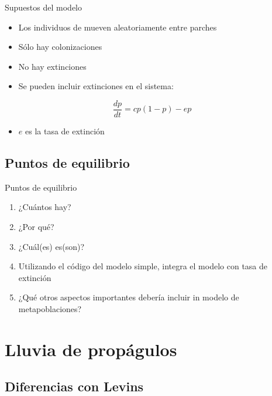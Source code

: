 \documentclass[
  11pt,
  ignorenonframetext,
]{beamer}
\providecommand{\tightlist}{%
  \setlength{\itemsep}{0pt}\setlength{\parskip}{0pt}}
\begin{document}
\begin{frame}{Supuestos del modelo}
\begin{itemize}
\item
  Los individuos de mueven aleatoriamente entre parches
\item
  Sólo hay colonizaciones
\item
  No hay extinciones
\item
  Se pueden incluir extinciones en el sistema:
\end{itemize}

\[ \frac{dp}{dt} = cp(1-p) - ep\]

\begin{itemize}
\tightlist
\item
  \(e\) es la tasa de extinción
\end{itemize}
\end{frame}

\subsection{Puntos de equilibrio}\label{puntos-de-equilibrio}

\begin{frame}{Puntos de equilibrio}
\begin{enumerate}
\item
  ¿Cuántos hay?
\item
  ¿Por qué?
\item
  ¿Cuál(es) es(son)?
\item
  Utilizando el código del modelo simple, integra el modelo con tasa de
  extinción
\item
  ¿Qué otros aspectos importantes debería incluir in modelo de
  metapoblaciones?
\end{enumerate}
\end{frame}

\section{Lluvia de propágulos}\label{lluvia-de-propuxe1gulos}

\subsection{Diferencias con Levins}\label{diferencias-con-levins}
\end{document}
